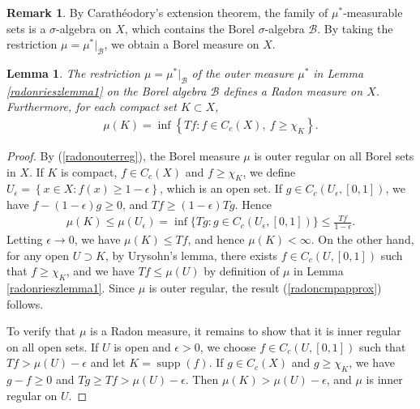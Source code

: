 \documentclass{article}
\numberwithin{equation}{section}
\newcommand{\scr}{\mathscr}
\DeclareMathOperator{\supp}{supp}
\theoremstyle{plain}
\newtheorem{lemma}[theorem]{Lemma}
\theoremstyle{definition}
\newtheorem*{remark}{Remark}
\begin{document}
\begin{remark} By Carathéodory's extension theorem, the family of $\mu^*$-measurable sets is a $\sigma$-algebra on $X$, which contains the Borel $\sigma$-algebra $\mathscr{B}$. By taking the restriction $\mu=\mu^*|_{\mathscr{B}}$, we obtain a Borel measure on $X$.
\begin{lemma}\label{radonrieszlemma2}
	The restriction $\mu=\mu^*|_{\mathscr{B}}$ of the outer measure $\mu^*$ in Lemma \ref{radonrieszlemma1} on the Borel algebra $\scr{B}$ defines a Radon measure on $X$. Furthermore, for each compact set $K\subset X$,
	\begin{align}
		\mu(K)=\inf\left\{Tf:f\in C_c(X),\ f\geq\chi_K\right\}.\label{radoncmpapprox}
	\end{align}
\end{lemma}
\end{remark}
\begin{proof}
	By (\ref{radonouterreg}), the Borel measure $\mu$ is outer regular on all Borel sets in $X$. If $K$ is compact, $f\in C_c(X)$ and $f\geq\chi_K$, we define $U_\epsilon=\left\{x\in X:f(x)\geq 1-\epsilon\right\}$, which is an open set. If $g\in C_c(U_\epsilon,[0,1])$, we have $f-(1-\epsilon)g\geq 0$, and $Tf\geq(1-\epsilon)Tg$. Hence
	\begin{align*}
		\mu(K)\leq\mu(U_\epsilon)=\inf\{Tg:g\in C_c(U_\epsilon,[0,1])\}\leq\frac{Tf}{1-\epsilon}.
	\end{align*}
	Letting $\epsilon\to 0$, we have $\mu(K)\leq Tf$, and hence $\mu(K)<\infty$. On the other hand, for any open $U\supset K$, by Urysohn's lemma, there exists $f\in C_c(U,[0,1])$ such that $f\geq\chi_K$, and we have $Tf\leq\mu(U)$ by definition of $\mu$ in Lemma \ref{radonrieszlemma1}. Since $\mu$ is outer regular, the result (\ref{radoncmpapprox}) follows.
	
	To verify that $\mu$ is a Radon measure, it remains to show that it is inner regular on all open sets. If $U$ is open and $\epsilon>0$, we choose $f\in C_c(U,[0,1])$ such that $Tf>\mu(U)-\epsilon$ and let $K=\supp(f)$. If $g\in C_c(X)$ and $g\geq\chi_K$, we have $g-f\geq 0$ and $Tg\geq Tf>\mu(U)-\epsilon$.  Then $\mu(K)>\mu(U)-\epsilon$, and $\mu$ is inner regular on $U$.
\end{proof}
\end{document}
